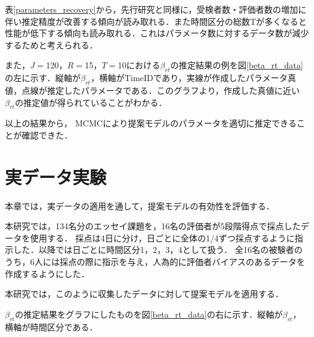 \documentclass[dvipdfmx, twocolumn, a4paper]{hcresume}
\begin{document}
表\ref{parameters_recovery}から，先行研究と同様に，受検者数・評価者数の増加に伴い推定精度が改善する傾向が読み取れる．また時間区分の総数Tが多くなると性能が低下する傾向も読み取れる．これはパラメータ数に対するデータ数が減少するためと考えられる．

また，$J=$120，$R=$15，$T=$10における$\beta_{rt}$の推定結果の例を図\ref{beta_rt_data}の左に示す．縦軸が$\beta_{rt}$，横軸がTimeIDであり，実線が作成したパラメータ真値，点線が推定したパラメータである．このグラフより，作成した真値に近い$\beta_{rt}$の推定値が得られていることがわかる．

以上の結果から， MCMCにより提案モデルのパラメータを適切に推定できることが確認できた．

\section{実データ実験}
本章では，実データの適用を通して，提案モデルの有効性を評価する．

本研究では，134名分のエッセイ課題を，16名の評価者が5段階得点で採点したデータを使用する．
採点は4日に分け，日ごとに全体の1/4ずつ採点するように指示した．以降では日ごとに時間区分1，2，3，4として扱う．
全16名の被験者のうち，6人には採点の際に指示を与え，人為的に評価者バイアスのあるデータを作成するようにした．


本研究では，このように収集したデータに対して提案モデルを適用する．

$\beta_{rt}$の推定結果をグラフにしたものを図\ref{beta_rt_data}の右に示す．縦軸が$\beta_{rt}$，横軸が時間区分である．
\end{document}
